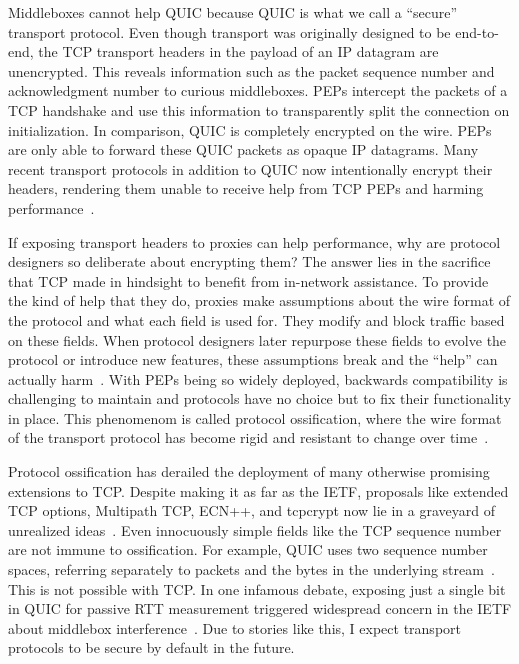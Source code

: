 Middleboxes cannot help QUIC because QUIC is what we call a ``secure'' transport
protocol. Even though transport was originally designed to be end-to-end, the
TCP transport headers in the payload of an IP datagram are unencrypted. This
reveals information such as the packet sequence number and acknowledgment
number to curious middleboxes. PEPs intercept the packets of a TCP handshake
and use this information to transparently split the connection on
initialization. In comparison, QUIC is completely encrypted on the wire. PEPs
are only able to forward these QUIC packets as opaque IP datagrams. Many recent
transport protocols in addition to QUIC now intentionally encrypt their
headers, rendering them unable to receive help from TCP PEPs and harming
performance~\cite{rfc8834webrtc,zoom,bittorrent,winstein2012mosh}.

If exposing transport headers to proxies can help performance, why are protocol
designers so deliberate about encrypting them? The answer lies in the sacrifice
that TCP made in hindsight to benefit from in-network assistance. To provide
the kind of help that they do, proxies make assumptions about the wire format
of the protocol and what each field is used for. They modify and block traffic
based on these fields. When protocol designers later repurpose these fields to
evolve the protocol or introduce new features, these assumptions break and the
``help'' can actually
harm~\cite{border2020quicsat-presentation,kuhn2021quic-over-sat,martin2022bbr-quic-sat,border2020evaluating,kosek2022quicpep}.
With PEPs being so widely deployed, backwards
compatibility is challenging to maintain and protocols have no choice but to
fix their functionality in place. This phenomenom is called protocol
ossification, where the wire format of the transport protocol has become
rigid and resistant to change over time~\cite{papastergiou2017deossifying, edeline2019bottomup}.

Protocol ossification has derailed the deployment of many otherwise promising
extensions to TCP. Despite making it as far as the IETF, proposals like
extended TCP options, Multipath TCP, ECN++, and tcpcrypt now lie in a graveyard
of unrealized ideas~\cite{mandalari2018ecnplusplus,imc2011handley,raiciu2012multipathtcp,rfc8548}.
Even innocuously simple fields like the TCP sequence
number are not immune to ossification. For example, QUIC uses two sequence
number spaces, referring separately to packets and the bytes in the underlying
stream~\cite{rfc9000}. This is not possible with TCP. In one infamous debate,
exposing just a single bit in QUIC for passive RTT measurement triggered
widespread concern in the IETF about middlebox interference~\cite{quicbit2018}.
Due to stories like this, I expect transport protocols to be secure by default
in the future.

